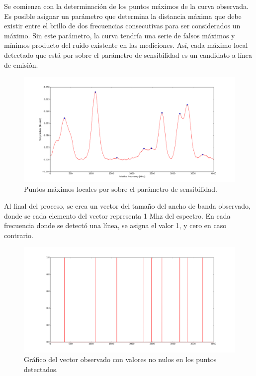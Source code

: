 Se comienza con la determinación de los puntos máximos de la curva observada. Es posible asignar un parámetro que determina la distancia máxima que debe existir entre el brillo de dos frecuencias consecutivas para ser considerados un máximo. Sin este parámetro, la curva tendría una serie de falsos máximos y mínimos producto del ruido existente en las mediciones. Así, cada máximo local detectado que está por sobre el parámetro de sensibilidad es un candidato a línea de emisión.

\begin{figure}[H]
	\begin{center}
		\includegraphics[width=140mm]{images/fig4}
		\caption{Puntos máximos locales por sobre el parámetro de sensibilidad. }
	\end{center}
\end{figure}

Al final del proceso, se crea un vector del tamaño del ancho de banda observado, donde se cada elemento del vector representa 1 Mhz del espectro. En cada frecuencia donde se detectó una línea, se asigna el valor 1, y cero en caso contrario.

\begin{figure}[H]
	\begin{center}
		\includegraphics[width=140mm]{images/fig5}
		\caption{Gráfico del vector observado con valores no nulos en los puntos detectados. }
	\end{center}
\end{figure}

